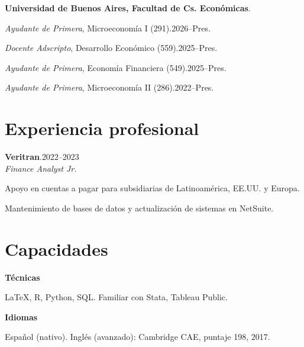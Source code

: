 \documentclass[11pt]{article}
\newcommand{\entrydate}[1]{\hfill{\small{#1}}}
\begin{document}
\textbf{Universidad de Buenos Aires, Facultad de Cs. Económicas}.
\begin{cvitems}
  \item \textit{Ayudante de Primera}, Microeconomía I (291).\entrydate{2026--Pres.}
  \item \textit{Docente Adscripto}, Desarrollo Económico (559).\entrydate{2025--Pres.}
  \item \textit{Ayudante de Primera}, Economía Financiera (549).\entrydate{2025--Pres.}
  \item \textit{Ayudante de Primera}, Microeconomía II (286).\entrydate{2022--Pres.}
\end{cvitems}

\section{Experiencia profesional}
\textbf{Veritran}.\entrydate{2022--2023}\\
\textit{Finance Analyst Jr.}
\begin{cvitems}
  \item Apoyo en cuentas a pagar para subsidiarias de Latinoamérica, EE.UU. y Europa.
  \item Mantenimiento de bases de datos y actualización de sistemas en NetSuite.
\end{cvitems}

\section{Capacidades}
\textbf{Técnicas}
\begin{cvitems}
  \item LaTeX, R, Python, SQL. Familiar con Stata, Tableau Public.
\end{cvitems}
\textbf{Idiomas}
\begin{cvitems}
\item Español (nativo). Inglés (avanzado): Cambridge CAE, puntaje 198, 2017.
\end{cvitems}
\end{document}
